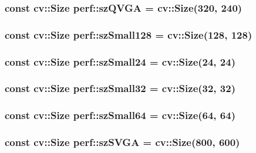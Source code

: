 \hypertarget{namespaceperf_a8d3d0bf3b89981e67bc30a3bd2befde1}{
\subsubsection[{sz\-Q\-V\-G\-A}]{\setlength{\rightskip}{0pt plus 5cm}const cv\-::\-Size perf\-::sz\-Q\-V\-G\-A = cv\-::\-Size(320, 240)}}\label{namespaceperf_a8d3d0bf3b89981e67bc30a3bd2befde1}
\hypertarget{namespaceperf_af5e22599b492125ccaba714aa0a729f4}{
\subsubsection[{sz\-Small128}]{\setlength{\rightskip}{0pt plus 5cm}const cv\-::\-Size perf\-::sz\-Small128 = cv\-::\-Size(128, 128)}}\label{namespaceperf_af5e22599b492125ccaba714aa0a729f4}
\hypertarget{namespaceperf_a7d5bf0103f9ee3afc0be30535b9c63d2}{
\subsubsection[{sz\-Small24}]{\setlength{\rightskip}{0pt plus 5cm}const cv\-::\-Size perf\-::sz\-Small24 = cv\-::\-Size(24, 24)}}\label{namespaceperf_a7d5bf0103f9ee3afc0be30535b9c63d2}
\hypertarget{namespaceperf_a00d601232dc9acbbd7ac710d2f0f0070}{
\subsubsection[{sz\-Small32}]{\setlength{\rightskip}{0pt plus 5cm}const cv\-::\-Size perf\-::sz\-Small32 = cv\-::\-Size(32, 32)}}\label{namespaceperf_a00d601232dc9acbbd7ac710d2f0f0070}
\hypertarget{namespaceperf_a814dfec6d0d13f821a164e3c562cc1ec}{
\subsubsection[{sz\-Small64}]{\setlength{\rightskip}{0pt plus 5cm}const cv\-::\-Size perf\-::sz\-Small64 = cv\-::\-Size(64, 64)}}\label{namespaceperf_a814dfec6d0d13f821a164e3c562cc1ec}
\hypertarget{namespaceperf_a8188190bc9ebd429fb46c05c671009c6}{
\subsubsection[{sz\-S\-V\-G\-A}]{\setlength{\rightskip}{0pt plus 5cm}const cv\-::\-Size perf\-::sz\-S\-V\-G\-A = cv\-::\-Size(800, 600)}}\label{namespaceperf_a8188190bc9ebd429fb46c05c671009c6}
